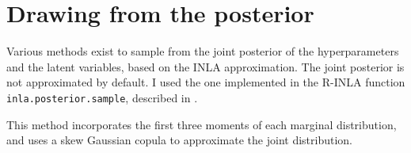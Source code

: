 \documentclass[thesis.tex]{subfiles}
\begin{document}
\section{Drawing from the posterior} \label{transmission:sec:INLA:posterior}

Various methods exist to sample from the joint posterior of the hyperparameters and the latent variables, based on the INLA approximation.
The joint posterior is not approximated by default.
I used the one implemented in the R-INLA function \texttt{inla.posterior.sample}, described in \textcite[section 4]{chiuchioloJoint}.

This method incorporates the first three moments of each marginal distribution, and uses a skew Gaussian copula to approximate the joint distribution.
\end{document}
